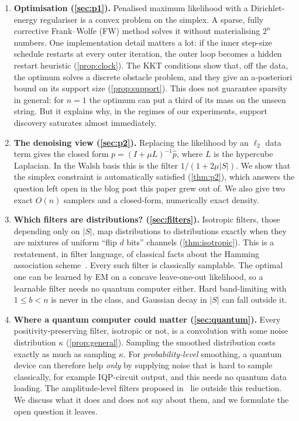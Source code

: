 \documentclass[11pt]{article}
\theoremstyle{definition}
\theoremstyle{remark}
\newcommand{\hp}{\hat p}
\begin{document}
\begin{enumerate}
\item \textbf{Optimisation (\cref{sec:p1}).} Penalised maximum likelihood with a Dirichlet-energy regulariser is a convex problem on the simplex. A sparse, fully corrective Frank--Wolfe (FW) method solves it without materialising $2^n$ numbers. One implementation detail matters a lot: if the inner step-size schedule restarts at every outer iteration, the outer loop becomes a hidden restart heuristic (\cref{prop:clock}). The KKT conditions show that, off the data, the optimum solves a discrete obstacle problem, and they give an a-posteriori bound on its support size (\cref{prop:support}). This does not guarantee sparsity in general: for $n=1$ the optimum can put a third of its mass on the unseen string. But it explains why, in the regimes of our experiments, support discovery saturates almost immediately.

\item \textbf{The denoising view (\cref{sec:p2}).} Replacing the likelihood by an $\ell_2$ data term gives the closed form $p=(I+\mu L)^{-1}\hp$, where $L$ is the hypercube Laplacian. In the Walsh basis this is the filter $1/(1+2\mu|S|)$. We show that the simplex constraint is automatically satisfied (\cref{thm:p2}), which answers the question left open in the blog post this paper grew out of. We also give two exact $O(n)$ samplers and a closed-form, numerically exact density.

\item \textbf{Which filters are distributions? (\cref{sec:filters}).} Isotropic filters, those depending only on $|S|$, map distributions to distributions exactly when they are mixtures of uniform ``flip $d$ bits'' channels (\cref{thm:isotropic}). This is a restatement, in filter language, of classical facts about the Hamming association scheme~\cite{delsarte1973algebraic}. Every such filter is classically samplable. The optimal one can be learned by EM on a concave leave-one-out likelihood, so a learnable filter needs no quantum computer either. Hard band-limiting with $1\le b<n$ is never in the class, and Gaussian decay in $|S|$ can fall outside it.

\item \textbf{Where a quantum computer could matter (\cref{sec:quantum}).} Every positivity-preserving filter, isotropic or not, is a convolution with some noise distribution $\kappa$ (\cref{prop:general}). Sampling the smoothed distribution costs exactly as much as sampling $\kappa$. For \emph{probability-level} smoothing, a quantum device can therefore help \emph{only} by supplying noise that is hard to sample classically, for example IQP-circuit output, and this needs no quantum data loading. The amplitude-level filters proposed in~\cite{belis2026spectral} lie outside this reduction. We discuss what it does and does not say about them, and we formulate the open question it leaves.
\end{enumerate}
\end{document}
